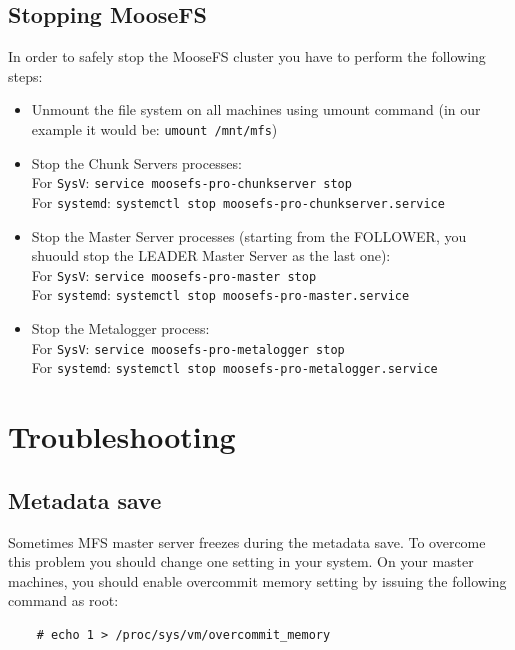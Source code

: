\documentclass[a4paper,11pt,english]{report}
\def\code#1{\texttt{#1}}
\begin{document}
	
		\section{Stopping MooseFS}
		In order to safely stop the MooseFS cluster you have to perform the following steps:
		\begin{itemize}
			\item Unmount the file system on all machines using umount command (in our example it would be: \code{umount /mnt/mfs})
			\item Stop the Chunk Servers processes:\\
				For \code{SysV}: \code{service moosefs-pro-chunkserver stop}\\
				For \code{systemd}: \code{systemctl stop moosefs-pro-chunkserver.service}
				 
			\item Stop the Master Server processes (starting from the FOLLOWER, you shuould stop the LEADER Master Server as the last one):\\
				For \code{SysV}: \code{service moosefs-pro-master stop}\\
				For \code{systemd}: \code{systemctl stop moosefs-pro-master.service}			
			
			\item Stop the Metalogger process:\\
				For \code{SysV}: \code{service moosefs-pro-metalogger stop}\\
				For \code{systemd}: \code{systemctl stop moosefs-pro-metalogger.service}		
		\end{itemize}	
	
	
	
	\chapter{Troubleshooting}
	
		\section{Metadata save}
		Sometimes MFS master server freezes during the metadata save. To overcome this problem you should change one setting in your system. On your master machines, you should enable overcommit memory setting by issuing the following command as root:

		\begin{lstlisting}
	# echo 1 > /proc/sys/vm/overcommit_memory
		\end{lstlisting}
\end{document}
